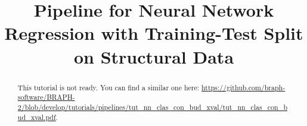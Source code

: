\documentclass[justified]{tufte-handout}
\title[Regression Training-Test Split Structural Data]{Pipeline for Neural Network Regression with Training-Test Split on Structural Data}
\begin{document}
\maketitle

\begin{abstract}
\noindent
This tutorial is not ready. You can find a similar one here: \url{https://github.com/braph-software/BRAPH-2/blob/develop/tutorials/pipelines/tut_nn_clas_con_bud_xval/tut_nn_clas_con_bud_xval.pdf}.
\end{abstract}
\end{document}
